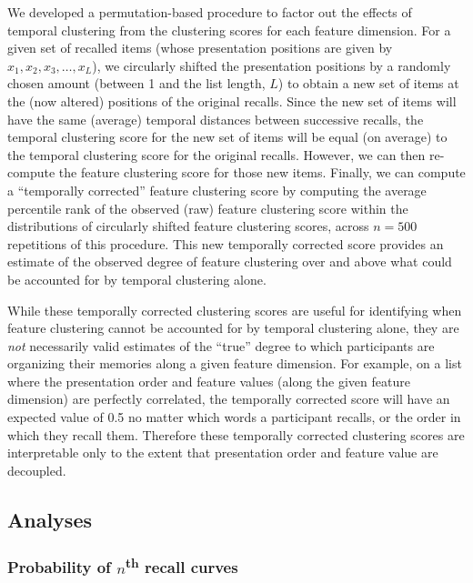 \documentclass[11pt]{article}
\begin{document}
We developed a permutation-based procedure to factor out the effects of
temporal clustering from the clustering scores for each feature dimension. For
a given set of recalled items (whose presentation positions are given by $x_1,
x_2, x_3, …, x_L$), we circularly shifted the presentation positions by a
randomly chosen amount (between 1 and the list length, $L$) to obtain a new set of
items at the (now altered) positions of the original recalls. Since the new set
of items will have the same (average) temporal distances between successive
recalls, the temporal clustering score for the new set of items will be equal
(on average) to the temporal clustering score for the original recalls.
However, we can then re-compute the feature clustering score for those new
items. Finally, we can compute a ``temporally corrected'' feature clustering
score by computing the average percentile rank of the observed (raw) feature
clustering score within the distributions of circularly shifted feature
clustering scores, across $n = 500$ repetitions of this procedure. This new
temporally corrected score provides an estimate of the observed degree of
feature clustering over and above what could be accounted for by temporal
clustering alone.

While these temporally corrected clustering scores are useful for identifying
when feature clustering cannot be accounted for by temporal clustering alone,
they are \textit{not} necessarily valid estimates of the ``true'' degree to
which participants are organizing their memories along a given feature
dimension. For example, on a list where the presentation order and feature
values (along the given feature dimension) are perfectly correlated, the
temporally corrected score will have an expected value of 0.5 no matter which
words a participant recalls, or the order in which they recall them. Therefore
these temporally corrected clustering scores are interpretable only to the
extent that presentation order and feature value are decoupled.

\subsection*{Analyses}

\subsubsection*{Probability of $n$\textsuperscript{th} recall curves}
\end{document}
